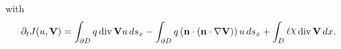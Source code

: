 \documentclass[preview]{standalone}
\let\oldcdot\cdot
\let\cdot\oldcdot
\begin{document}
with
\begin{dmath*}
\partial_{t} J(u,{\mathbf V}) =  \int_{\partial D} q \operatorname{div} {\mathbf V} u \,ds_x -  \int_{\partial D} q \left( \mathbf n \cdot \left( \mathbf n \cdot  \nabla {\mathbf V}  \right) \right) u \,ds_x +  \int_{D} \ell \raisebox{\depth}{$\chi$} \operatorname{div} {\mathbf V} \,dx.
 \end{dmath*}
\end{document}
